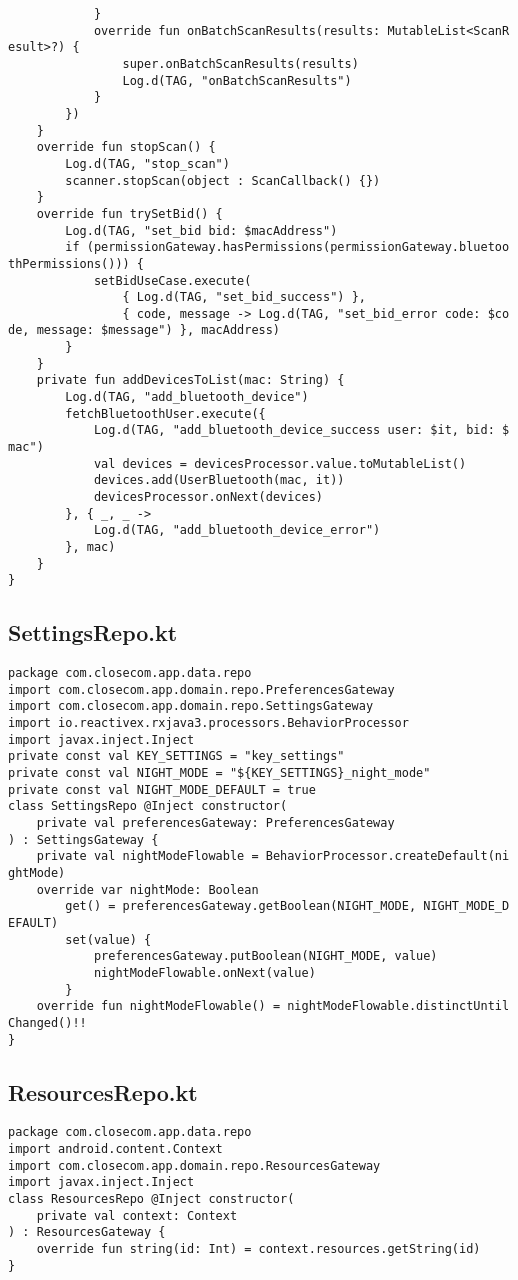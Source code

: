 \documentclass[listing]{espd}
\begin{document}
\begin{verbatim}
            }
            override fun onBatchScanResults(results: MutableList<ScanR
esult>?) {
                super.onBatchScanResults(results)
                Log.d(TAG, "onBatchScanResults")
            }
        })
    }
    override fun stopScan() {
        Log.d(TAG, "stop_scan")
        scanner.stopScan(object : ScanCallback() {})
    }
    override fun trySetBid() {
        Log.d(TAG, "set_bid bid: $macAddress")
        if (permissionGateway.hasPermissions(permissionGateway.bluetoo
thPermissions())) {
            setBidUseCase.execute(
                { Log.d(TAG, "set_bid_success") },
                { code, message -> Log.d(TAG, "set_bid_error code: $co
de, message: $message") }, macAddress)
        }
    }
    private fun addDevicesToList(mac: String) {
        Log.d(TAG, "add_bluetooth_device")
        fetchBluetoothUser.execute({
            Log.d(TAG, "add_bluetooth_device_success user: $it, bid: $
mac")
            val devices = devicesProcessor.value.toMutableList()
            devices.add(UserBluetooth(mac, it))
            devicesProcessor.onNext(devices)
        }, { _, _ ->
            Log.d(TAG, "add_bluetooth_device_error")
        }, mac)
    }
}
\end{verbatim}

\subsection{SettingsRepo.kt}
\begin{verbatim}
package com.closecom.app.data.repo
import com.closecom.app.domain.repo.PreferencesGateway
import com.closecom.app.domain.repo.SettingsGateway
import io.reactivex.rxjava3.processors.BehaviorProcessor
import javax.inject.Inject
private const val KEY_SETTINGS = "key_settings"
private const val NIGHT_MODE = "${KEY_SETTINGS}_night_mode"
private const val NIGHT_MODE_DEFAULT = true
class SettingsRepo @Inject constructor(
    private val preferencesGateway: PreferencesGateway
) : SettingsGateway {
    private val nightModeFlowable = BehaviorProcessor.createDefault(ni
ghtMode)
    override var nightMode: Boolean
        get() = preferencesGateway.getBoolean(NIGHT_MODE, NIGHT_MODE_D
EFAULT)
        set(value) {
            preferencesGateway.putBoolean(NIGHT_MODE, value)
            nightModeFlowable.onNext(value)
        }
    override fun nightModeFlowable() = nightModeFlowable.distinctUntil
Changed()!!
}
\end{verbatim}

\subsection{ResourcesRepo.kt}
\begin{verbatim}
package com.closecom.app.data.repo
import android.content.Context
import com.closecom.app.domain.repo.ResourcesGateway
import javax.inject.Inject
class ResourcesRepo @Inject constructor(
    private val context: Context
) : ResourcesGateway {
    override fun string(id: Int) = context.resources.getString(id)
}
\end{verbatim}
\end{document}
